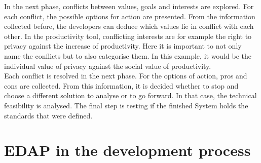 In the next phase, conflicts between values, goals and interests are explored. For each conflict, the possible options for action are presented. From the information collected before, the developers can deduce which values lie in conflict with each other. In the productivity tool, conflicting interests are for example the right to privacy against the increase of productivity. Here it is important to not only name the conflicts but to also categorise them. In this example, it would be the individual value of privacy against the social value of productivity.\\
Each conflict is resolved in the next phase. For the options of action, pros and cons are collected. From this information, it is decided whether to stop and choose a different solution to analyse or to go forward. In that case, the technical feasibility is analysed. The final step is testing if the finished System holds the standards that were defined.

\section{EDAP in the development process}
